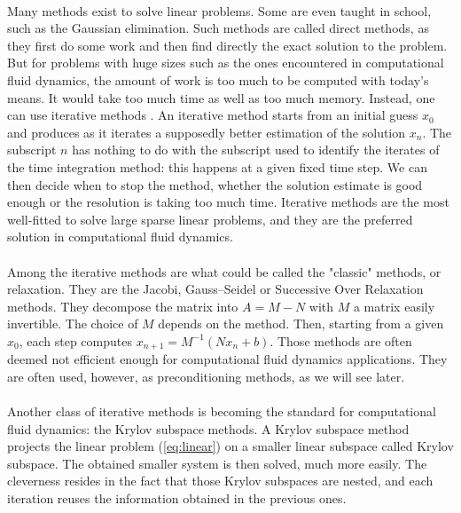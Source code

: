       \paragraph{}
      Many methods exist to solve linear problems.
      Some are even taught in school, such as the Gaussian elimination.
      Such methods are called direct methods, as they first do some work and then find directly the exact solution to the problem.
      But for problems with huge sizes such as the ones encountered in computational fluid dynamics, the amount of work is too much to be computed with today's means.
      It would take too much time as well as too much memory.
      Instead, one can use iterative methods .
      An iterative method starts from an initial guess $x_0$ and produces as it iterates a supposedly better estimation of the solution $x_n$.
      The subscript $n$ has nothing to do with the subscript used to identify the iterates of the time integration method: this happens at a given fixed time step.
      We can then decide when to stop the method, whether the solution estimate is good enough or the resolution is taking too much time.
      Iterative methods are the most well-fitted to solve large sparse linear problems, and they are the preferred solution in computational fluid dynamics.

      \paragraph{}
      Among the iterative methods are what could be called the "classic" methods, or relaxation.
      They are the Jacobi, Gauss--Seidel or Successive Over Relaxation methods.
      They decompose the matrix into $A = M - N$ with $M$ a matrix easily invertible.
      The choice of $M$ depends on the method.
      Then, starting from a given $x_0$, each step computes $x_{n+1} = M^{-1} \left( N x_n + b \right)$.
      Those methods are often deemed not efficient enough for computational fluid dynamics applications.
      They are often used, however, as preconditioning methods, as we will see later.

      \paragraph{}
      Another class of iterative methods is becoming the standard for computational fluid dynamics: the Krylov subspace methods.
      A Krylov subspace method projects the linear problem (\ref{eq:linear}) on a smaller linear subspace called Krylov subspace.
      The obtained smaller system is then solved, much more easily.
      The cleverness resides in the fact that those Krylov subspaces are nested, and each iteration reuses the information obtained in the previous ones.

